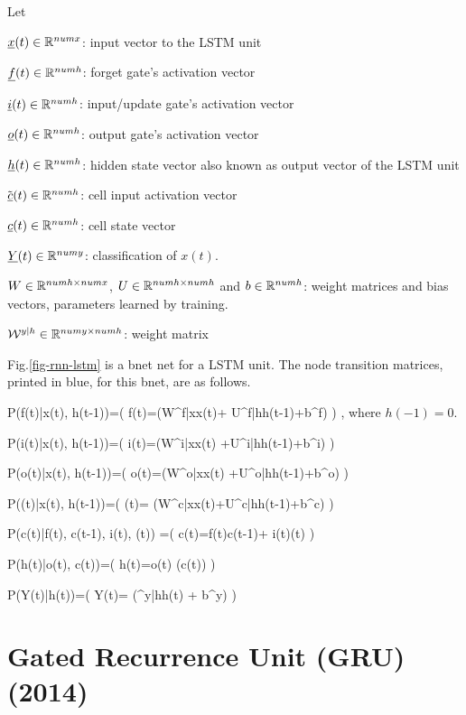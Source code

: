 Let

${\underline{x}}(t)\in { \mathbb{R}}^{numx}$: 
input vector to the LSTM unit

${\underline{f}}(t)\in { \mathbb{R}}^{numh}$:
forget gate's activation vector

${\underline{i}}(t)\in { \mathbb{R}}^{numh}$: 
input/update gate's activation vector

${\underline{o}}(t)\in { \mathbb{R}}^{numh}$: 
output gate's activation vector

${\underline{h}}(t)\in { \mathbb{R}}^{numh}$: 
hidden state vector also known as
 output vector of the LSTM unit

${\tilde {{\underline{c}}}}(t)\in { \mathbb{R}}^{numh}$: 
cell input activation vector

${\underline{c}}(t)\in { \mathbb{R}}^{numh}$: 
cell state vector

${\underline{Y}}(t)\in { \mathbb{R}}^{numy}$: 
classification of $x(t)$.

$W\in { \mathbb{R}}^{numh\times numx}$, 
$U\in { \mathbb{R}}^{numh\times numh}$
and 
$b\in { \mathbb{R}}^{numh}$: 
weight matrices and bias vectors,
 parameters learned by training.

${\cal W}^{y|h}\in { \mathbb{R}}^{numy\times numh}$:
 weight matrix


Fig.\ref{fig-rnn-lstm}
is a bnet net
for a LSTM unit.
The node transition matrices, printed in blue,
for this bnet, are
as follows.

\beq\color{blue}
P(f(t)|x(t), h(t-1))=\indi(\;\;\;
f(t)=\sig(W^{f|x}x(t)+
U^{f|h}h(t-1)+b^{f})
\;\;\;)
\;,
\eeq
where $h(-1)=0$.

\beq\color{blue}
P(i(t)|x(t), h(t-1))=\indi(\;\;\;
i(t)=\sig(W^{i|x}x(t)
+U^{i|h}h(t-1)+b^{i})
\;\;\;)
\eeq

\beq\color{blue}
P(o(t)|x(t), h(t-1))=\indi(\;\;\;
o(t)=\sig(W^{o|x}x(t)
+U^{o|h}h(t-1)+b^{o})
\;\;\;)
\eeq

\beq\color{blue}
P((t)|x(t), h(t-1))=\indi(\;\;\;
(t)=\tanh
(W^{c|x}x(t)+U^{c|h}h(t-1)+b^{c})
\;\;\;)
\eeq

\beq\color{blue}
P(c(t)|f(t), c(t-1), i(t),
 (t))
=\indi(\;\;\;
c(t)=f(t)\odot c(t-1)+
i(t)(t)
\;\;\;)
\eeq

\beq\color{blue}
P(h(t)|o(t), c(t))=\indi(\;\;\;
h(t)=o(t)\odot \tanh
(c(t))
\;\;\;)
\eeq



\beq\color{blue}
P(Y(t)|h(t))=\indi(\;\;\;
Y(t)= \cala(\calw^{y|h}h(t) + b^y)
\;\;\;)
\eeq

\newpage
\section*{Gated Recurrence Unit
 (GRU) (2014)}

